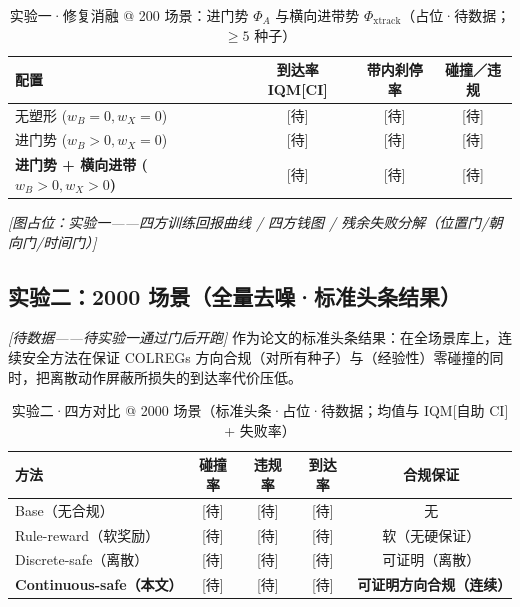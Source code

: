 \documentclass[12pt,letterpaper]{article}
\begin{document}
\begin{table}[h]
  \caption{实验一·修复消融 @ 200 场景：进门势 $\Phi_A$ 与横向进带势 $\Phi_{\text{xtrack}}$（占位·待数据；$\ge 5$ 种子）}
  \label{tab:ablation200}
  \centering
  \begin{tabular}{lccc}
    \toprule
    \textbf{配置} & \textbf{到达率 IQM[CI]} & \textbf{带内刹停率} & \textbf{碰撞／违规} \\
    \midrule
    无塑形 ($w_B{=}0,w_X{=}0$)          & [待] & [待] & [待] \\
    进门势 ($w_B{>}0,w_X{=}0$)          & [待] & [待] & [待] \\
    \textbf{进门势 + 横向进带 ($w_B{>}0,w_X{>}0$)} & [待] & [待] & [待] \\
    \bottomrule
  \end{tabular}
\end{table}

\textit{[图占位：实验一——四方训练回报曲线 / 四方钱图 / 残余失败分解（位置门/朝向门/时间门）]}

\subsection{实验二：2000 场景（全量去噪·标准头条结果）}
\textit{[待数据——待实验一通过门后开跑]} 作为论文的标准头条结果：在全场景库上，连续安全方法在保证 COLREGs 方向合规（对所有种子）与（经验性）零碰撞的同时，把离散动作屏蔽所损失的到达率代价压低。

\begin{table}[h]
  \caption{实验二·四方对比 @ 2000 场景（标准头条·占位·待数据；均值与 IQM[自助 CI] + 失败率）}
  \label{tab:main2000}
  \centering
  \begin{tabular}{lcccc}
    \toprule
    \textbf{方法} & \textbf{碰撞率} & \textbf{违规率} & \textbf{到达率} & \textbf{合规保证} \\
    \midrule
    Base（无合规）        & [待] & [待] & [待] & 无 \\
    Rule-reward（软奖励）  & [待] & [待] & [待] & 软（无硬保证） \\
    Discrete-safe（离散）  & [待] & [待] & [待] & 可证明（离散） \\
    \textbf{Continuous-safe（本文）} & [待] & [待] & [待] & \textbf{可证明方向合规（连续）} \\
    \bottomrule
  \end{tabular}
\end{table}
\end{document}

